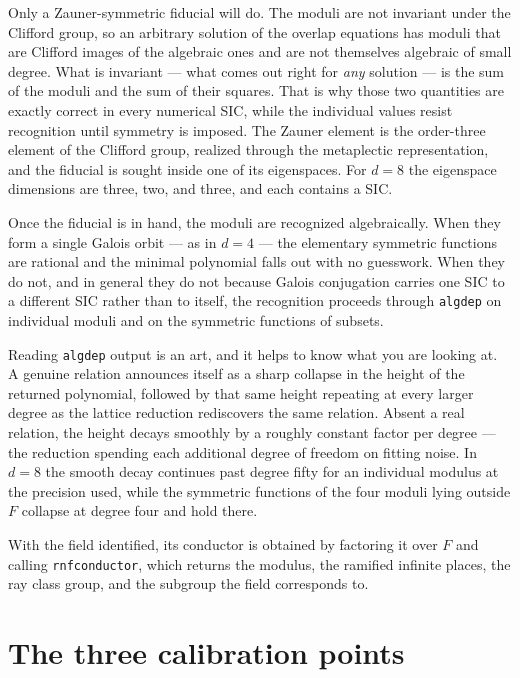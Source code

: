 \documentclass[12pt,a4paper]{article}
\newcommand{\Fd}{F}
\begin{document}
Only a Zauner-symmetric fiducial will do. The moduli are not invariant under the Clifford group, so an arbitrary solution of the overlap equations has moduli that are Clifford images of the algebraic ones and are not themselves algebraic of small degree. What is invariant — what comes out right for \emph{any} solution — is the sum of the moduli and the sum of their squares. That is why those two quantities are exactly correct in every numerical SIC, while the individual values resist recognition until symmetry is imposed. The Zauner element is the order-three element of the Clifford group, realized through the metaplectic representation, and the fiducial is sought inside one of its eigenspaces. For $d=8$ the eigenspace dimensions are three, two, and three, and each contains a SIC.

Once the fiducial is in hand, the moduli are recognized algebraically. When they form a single Galois orbit — as in $d=4$ — the elementary symmetric functions are rational and the minimal polynomial falls out with no guesswork. When they do not, and in general they do not because Galois conjugation carries one SIC to a different SIC rather than to itself, the recognition proceeds through \texttt{algdep} on individual moduli and on the symmetric functions of subsets.

Reading \texttt{algdep} output is an art, and it helps to know what you are looking at. A genuine relation announces itself as a sharp collapse in the height of the returned polynomial, followed by that same height repeating at every larger degree as the lattice reduction rediscovers the same relation. Absent a real relation, the height decays smoothly by a roughly constant factor per degree — the reduction spending each additional degree of freedom on fitting noise. In $d=8$ the smooth decay continues past degree fifty for an individual modulus at the precision used, while the symmetric functions of the four moduli lying outside $\Fd$ collapse at degree four and hold there.

With the field identified, its conductor is obtained by factoring it over $\Fd$ and calling \texttt{rnfconductor}, which returns the modulus, the ramified infinite places, the ray class group, and the subgroup the field corresponds to.

\section{The three calibration points}
\label{sec:calibration}
\end{document}

